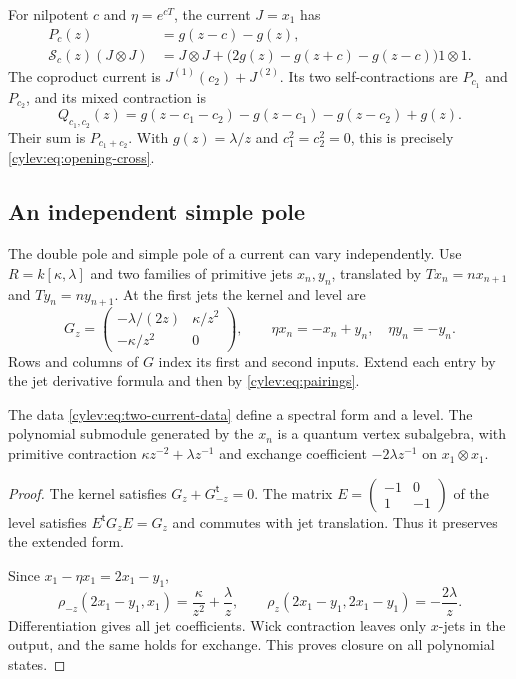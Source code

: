 For nilpotent $c$ and $\eta=e^{cT}$, the current $J=x_1$ has
\begin{align}
 P_c(z)&=g(z-c)-g(z),\label{cylev:eq:translation-kernel}\\
 \mathcal S_c(z)(J\otimes J)
 &=J\otimes J+
       \bigl(2g(z)-g(z+c)-g(z-c)\bigr)1\otimes1.
       \label{cylev:eq:translation-exchange}
\end{align}
The coproduct current is $J^{(1)}(c_2)+J^{(2)}$.
Its two self-contractions are $P_{c_1}$ and $P_{c_2}$, and its
mixed contraction is
\begin{equation}\label{cylev:eq:cross-kernel}
 Q_{c_1,c_2}(z)=g(z-c_1-c_2)-g(z-c_1)-g(z-c_2)+g(z).
\end{equation}
Their sum is $P_{c_1+c_2}$.
With $g(z)=\lambda/z$ and $c_1^2=c_2^2=0$, this is precisely
\eqref{cylev:eq:opening-cross}.

\subsection{An independent simple pole}

The double pole and simple pole of a current can vary independently.
Use $R=k[\kappa,\lambda]$ and two families of primitive jets
$x_n,y_n$, translated by $Tx_n=nx_{n+1}$ and $Ty_n=ny_{n+1}$.
At the first jets the kernel and level are
\begin{equation}\label{cylev:eq:two-current-data}
 G_z=\begin{pmatrix}
 -\lambda/(2z)&\kappa/z^2\\
 -\kappa/z^2&0
 \end{pmatrix},\qquad
 \eta x_n=-x_n+y_n,\quad \eta y_n=-y_n.
\end{equation}
Rows and columns of $G$ index its first and second inputs.
Extend each entry by the jet derivative formula and then by
\eqref{cylev:eq:pairings}.

\begin{proposition}\label{cylev:prop:two-current}
The data \eqref{cylev:eq:two-current-data} define a spectral form
and a level. The polynomial submodule generated by the $x_n$ is
a quantum vertex subalgebra, with primitive contraction
$\kappa z^{-2}+\lambda z^{-1}$ and exchange coefficient
$-2\lambda z^{-1}$ on $x_1\otimes x_1$.
\end{proposition}
\begin{proof}
The kernel satisfies $G_z+G_{-z}^{\mathsf t}=0$.
The matrix $E=\left(\begin{smallmatrix}-1&0\\1&-1\end{smallmatrix}\right)$
of the level satisfies $E^{\mathsf t}G_zE=G_z$ and commutes with
jet translation. Thus it preserves the extended form.

Since $x_1-\eta x_1=2x_1-y_1$,
\[
 \rho_{-z}(2x_1-y_1,x_1)=\frac\kappa{z^2}+\frac\lambda z,
 \qquad
 \rho_z(2x_1-y_1,2x_1-y_1)=-\frac{2\lambda}{z}.
\]
Differentiation gives all jet coefficients.
Wick contraction leaves only $x$-jets in the output, and the same
holds for exchange. This proves closure on all polynomial states.
\end{proof}

